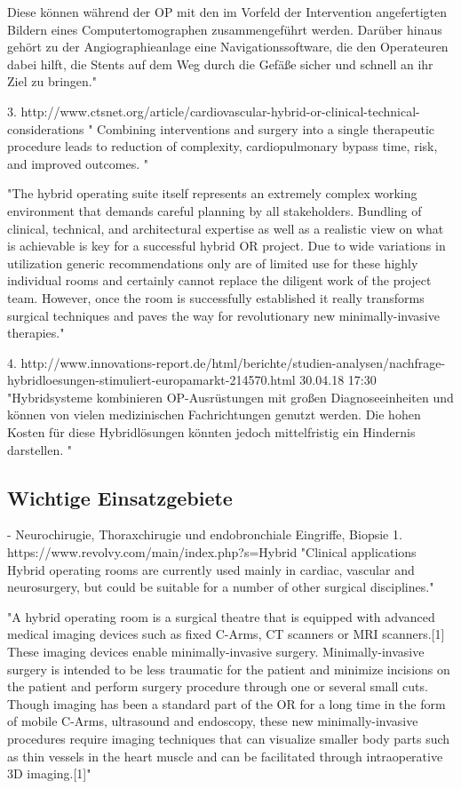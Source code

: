 	Diese können während der OP mit den im Vorfeld der Intervention angefertigten Bildern eines Computertomographen zusammengeführt werden. Darüber hinaus gehört zu der Angiographieanlage eine Navigationssoftware, die den Operateuren dabei hilft, die Stents auf dem Weg durch die Gefäße sicher und schnell an ihr Ziel zu bringen."

3. http://www.ctsnet.org/article/cardiovascular-hybrid-or-clinical-technical-considerations	
	" Combining interventions and surgery into a single therapeutic procedure leads to reduction of complexity, cardiopulmonary bypass time, risk, and improved outcomes. "

	"The hybrid operating suite itself represents an extremely complex working environment that demands careful planning by all stakeholders. Bundling of clinical, technical, and architectural expertise as well as a realistic view on what is achievable is key for a successful hybrid OR project. Due to wide variations in utilization generic recommendations only are of limited use for these highly individual rooms and certainly cannot replace the diligent work of the project team. However, once the room is successfully established it really transforms surgical techniques and paves the way for revolutionary new minimally-invasive therapies."

4. http://www.innovations-report.de/html/berichte/studien-analysen/nachfrage-hybridloesungen-stimuliert-europamarkt-214570.html 30.04.18 17:30	
	"Hybridsysteme kombinieren OP-Ausrüstungen mit großen Diagnoseeinheiten und können von vielen medizinischen Fachrichtungen genutzt werden. Die hohen Kosten für diese Hybridlösungen könnten jedoch mittelfristig ein Hindernis darstellen. "

\subsection{Wichtige Einsatzgebiete}
	- Neurochirugie, Thoraxchirugie und endobronchiale Eingriffe, Biopsie
1. https://www.revolvy.com/main/index.php?s=Hybrid%
	"Clinical applications
	Hybrid operating rooms are currently used mainly in cardiac, vascular and neurosurgery, but could be suitable for a number of other surgical disciplines."

	"A hybrid operating room is a surgical theatre that is equipped with advanced medical imaging devices such as fixed C-Arms, CT scanners or MRI scanners.[1] These imaging devices enable minimally-invasive surgery. Minimally-invasive surgery is intended to be less traumatic for the patient and minimize incisions on the patient and perform surgery procedure through one or several small cuts.
	Though imaging has been a standard part of the OR for a long time in the form of mobile C-Arms, ultrasound and endoscopy, these new minimally-invasive procedures require imaging techniques that can visualize smaller body parts such as thin vessels in the heart muscle and can be facilitated through intraoperative 3D imaging.[1]"

